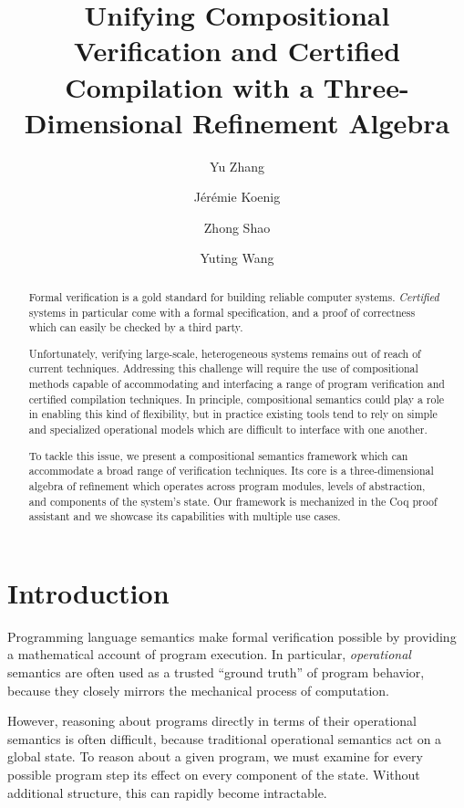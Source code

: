 \documentclass[acmsmall,screen,review,anonymous,nonacm]{acmart}
\title{Unifying Compositional Verification and Certified Compilation
  with a Three-Dimensional Refinement Algebra}
\author{Yu Zhang}
\affiliation{
  \institution{Yale University}
  \city{New Haven}
  \state{CT}
  \country{USA}}
\author{J\'er\'emie Koenig}
\affiliation{
  \institution{Yale University}
  \city{New Haven}
  \state{CT}
  \country{USA}}
\author{Zhong Shao}
\affiliation{
  \institution{Yale University}
  \city{New Haven}
  \state{CT}
  \country{USA}}
\author{Yuting Wang}
\affiliation{
  \institution{Shanghai Jiao Tong University}
  \city{Shanghai}
  \country{China}}
\begin{document}
\newtheorem{remark}[theorem]{Remark}

\begin{abstract} %
Formal verification is a gold standard
for building reliable computer systems.
\emph{Certified} systems in particular
come with a formal specification,
and a proof of correctness
which can easily be checked by a third party.

Unfortunately, verifying large-scale, heterogeneous systems
remains out of reach of current techniques.
Addressing this challenge
will require the use of compositional methods
capable of accommodating and interfacing
a range of program verification and certified compilation techniques.
In principle,
compositional semantics
could play a role in enabling this kind of flexibility, but
in practice
existing tools
tend to rely on
simple and specialized
operational models
which are difficult to interface with one another.

To tackle this issue,
we present a compositional semantics framework
which can accommodate a broad range of verification techniques.
Its core is a three-dimensional algebra of refinement
which operates across program modules,
levels of abstraction, and
components of the system's state.
Our framework is mechanized in the Coq proof assistant
and we showcase its capabilities with multiple use cases.
\end{abstract}


\maketitle

\section{Introduction} %


Programming language semantics
make formal verification possible
by providing a mathematical account of program execution.
In particular,
\emph{operational} semantics
are often used as a trusted ``ground truth''
of program behavior,
because they closely mirrors
the mechanical process of computation.

However,
reasoning about programs
directly in terms of their operational semantics
is often difficult, because
traditional operational semantics act on a global state.
To reason about a given program,
we must examine for every possible program step
its effect on every component of the state.
Without additional structure,
this can rapidly become intractable.
\end{document}
